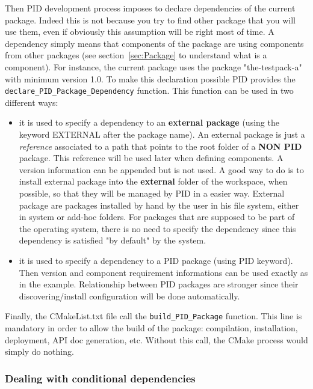 \documentclass[12pt,a4paper]{article}
\begin{document}
Then PID development process imposes to declare dependencies of the current package. Indeed this is not because you try to find other package that you will use them, even if obviously this assumption will be right most of time. A dependency simply means that components of the package are using components from other packages (see section~\ref{sec:Package} to understand what is a component). For instance, the current package uses the package "the-testpack-a" with minimum version 1.0. To make this declaration possible PID provides the \texttt{declare\_PID\_Package\_Dependency} function. This function can be used in two different ways:
\begin{itemize}
\item it is used to specify a dependency to an \textbf{external package} (using the keyword EXTERNAL after the package name). An external package is just a \textit{reference} associated to a path that points to the root folder of a \textbf{NON PID} package. This reference will be used later when defining components. A version information can be appended but is not used. A good way to do is to install external package into the \textbf{external} folder of the workspace, when possible, so that they will be managed by PID in a easier way. External package are packages installed by hand by the user in his file system, either in system or add-hoc folders. For packages that are supposed to be part of the operating system, there is no need to specify the dependency since this dependency is satisfied "by default" by the system.
\item it is used to specify a dependency to a PID package (using PID keyword). Then version and component requirement informations can be used exactly as in the example. Relationship between PID packages are stronger since their discovering/install configuration will be done automatically.
\end{itemize}

Finally, the CMakeList.txt file call the \texttt{build\_PID\_Package} function. This line is mandatory in order to allow the build of the package: compilation, installation, deployment, API doc generation, etc. Without this call, the CMake process would simply do nothing.

\subsubsection{Dealing with conditional dependencies}
\label{sec:rootCMakeComplexDeps}
\end{document}
